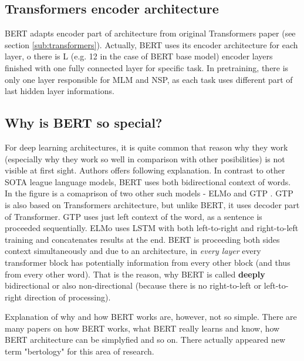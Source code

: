 \subsection{Transformers encoder architecture}
BERT adapts encoder part of architecture from original Transformers paper   \citep{Vaswani2017} (see section \ref{sub:transformers}).
Actually, BERT uses its encoder architecture for each layer, 
 o there is L (e.g. 12 in the case of BERT base model) encoder layers finished with one fully connected layer for specific task. In pretraining, there is only one layer responsible for MLM and NSP, as each task uses different part of last hidden layer informations. %
 
 \subsection{Why is BERT so special?}
 \label{sub:specialBert}
For deep learning architectures, it is quite common that reason why they work (especially why they work so well in comparison with other posibilities) is not visible at first sight. Authors offers following explanation. In contrast to other SOTA league language models, BERT uses both bidirectional context of words. In the figure %
is a comaprison of two other such models - ELMo and GTP %
. GTP is also based on Transformers architecture, but unlike BERT, it uses decoder part of Transformer. 
GTP uses just left context of the word, as a sentence is proceeded sequentially. ELMo uses LSTM %
with both left-to-right and right-to-left training and concatenates results at the end. BERT is proceeding both sides context simultaneously and due to an architecture, in \textit{every layer} every transformer block has potentially information from every other block (and thus from every other word). That is the reason, why BERT is called \textbf{deeply} bidirectional or also non-directional (because there is no right-to-left or left-to-right direction of processing).
\par
Explanation of why and how BERT works are, however, not so simple. There are many papers on how BERT works, what BERT really learns and know, how BERT architecture can be simplyfied and so on. There actually appeared new term "bertology" for this area of research.
 

